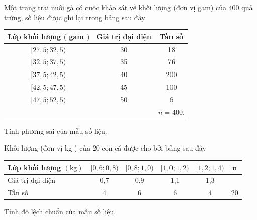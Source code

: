 \begin{ex}%
Một trang trại nuôi gà có cuộc khảo sát về khối lượng (đơn vị gam) của $400$ quả trứng, số liệu được ghi lại trong bảng sau đây
\begin{center}
\begin{tabular}{|c|c|c|}
\hline Lớp khối lượng $($ gam $)$ & Giá trị đại diện & Tần số \\
\hline$[27{,}5 ; 32{,}5)$ & 30 & 18 \\
\hline$[32{,}5 ; 37{,}5)$ & 35 & 76 \\
\hline$[37{,}5 ; 42{,}5)$ & 40 & 200 \\
\hline$[42{,}5 ; 47{,}5)$ & 45 & 100 \\
\hline$[47{,}5 ; 52{,}5)$ & 50 & 6 \\
\hline & & $n=400$. \\
\hline
\end{tabular}
\end{center}
Tính phương sai của mẫu số liệu.
\end{ex}

\begin{ex}%
Khối lượng (đơn vị kg ) của $20$ con cá được cho bởi bảng sau đây
\begin{center}
\begin{tabular}{|l|c|c|c|c|c|}
\hline Lớp khối lượng $(\mathrm{kg})$ & {$[0{,}6 ; 0{,}8)$} & {$[0{,}8 ; 1{,}0)$} & {$[1{,}0 ; 1{,}2)$} & {$[1{,}2 ; 1{,}4)$} & $\mathbf{n}$ \\
\hline Giá trị đại diện & 0{,}7 & 0{,}9 & 1{,}1 & 1{,}3 & \\
\hline Tần số & 4 & 6 & 6 & 4 & $20$ \\
\hline
\end{tabular}
\end{center}
Tính độ lệch chuẩn của mẫu số liệu.
\end{ex}

